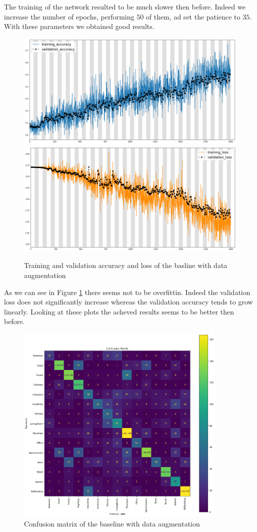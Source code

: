 \documentclass[12pt, a4paper]{report}
\begin{document}
The training of the network resulted to be much slower then before. Indeed we increase the number of epochs, performing $50$ of them, ad set the patience to $35$. With these parameters we obtained good results.
 
\begin{figure}[h!]
	\centering
 	{\includegraphics[width=.49\textwidth]{img/aug2_accuracy}}
 	{\includegraphics[width=.49\textwidth]{img/aug2_loss}}
 	\caption{Training and validation accuracy and loss of the basline with data augmentation}
 	\label{fig:augmented2}
\end{figure}

As we can see in Figure \ref{fig:augmented2} there seems not to be overfittin. Indeed the validation loss does not significantly increase whereas the validation accuracy tends to grow linearly. Looking at these plots the acheved results seems to be better then before.

\begin{figure}[h!]
	\centering
	\includegraphics[width=0.9\textwidth]{img/aug2_cmatrix}
	\caption{Confusion matrix of the baseline with data augmentation}
	\label{fig:augcmatrix2}
\end{figure}
\end{document}
